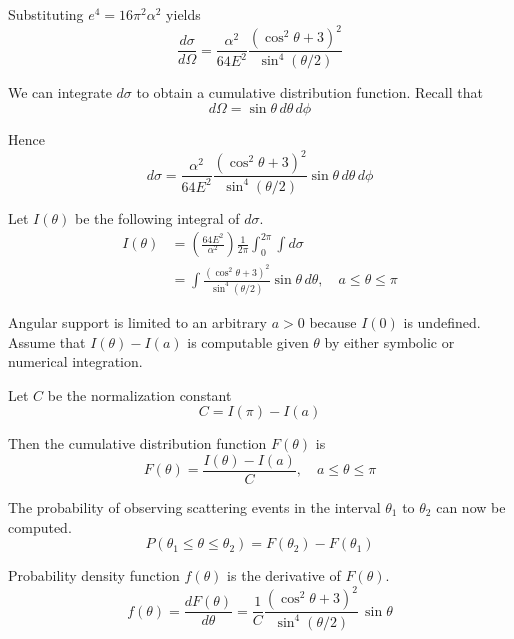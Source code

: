 \documentclass[12pt]{article}
\begin{document}
\noindent
Substituting $e^4=16\pi^2\alpha^2$ yields
\begin{equation*}
\frac{d\sigma}{d\Omega}
=\frac{\alpha^2}{64E^2}
\frac{\left(\cos^2\theta+3\right)^2}{\sin^4(\theta/2)}
\end{equation*}

\noindent
We can integrate $d\sigma$ to obtain a cumulative distribution function.
Recall that
\begin{equation*}
d\Omega=\sin\theta\,d\theta\,d\phi
\end{equation*}

\noindent
Hence
\begin{equation*}
d\sigma=\frac{\alpha^2}{64E^2}
\frac{\left(\cos^2\theta+3\right)^2}{\sin^4(\theta/2)}\sin\theta\,d\theta\,d\phi
\end{equation*}

\bigskip
\noindent
Let $I(\theta)$ be the following integral of $d\sigma$.
\begin{align*}
I(\theta)
&=\left(\frac{64E^2}{\alpha^2}\right)\frac{1}{2\pi}
\int_0^{2\pi}\int d\sigma
\\
&=\int\frac{\left(\cos^2\theta+3\right)^2}{\sin^4(\theta/2)}\sin\theta\,d\theta,
\quad a\le\theta\le\pi
\end{align*}

\noindent
Angular support is limited to an arbitrary $a>0$ because $I(0)$ is undefined.
Assume that $I(\theta)-I(a)$ is computable given $\theta$ by either symbolic or numerical integration.

\bigskip
\noindent
Let $C$ be the normalization constant
\begin{equation*}
C=I(\pi)-I(a)
\end{equation*}

\noindent
Then the cumulative distribution function $F(\theta)$ is
\begin{equation*}
F(\theta)=\frac{I(\theta)-I(a)}{C},
\quad a\le\theta\le\pi
\end{equation*}

\noindent
The probability of observing scattering events in the interval $\theta_1$ to $\theta_2$
can now be computed.
\begin{equation*}
P(\theta_1\le\theta\le\theta_2)=F(\theta_2)-F(\theta_1)
\end{equation*}

\noindent
Probability density function $f(\theta)$ is the derivative of $F(\theta)$.
\begin{equation*}
f(\theta)=\frac{dF(\theta)}{d\theta}
=\frac{1}{C}\frac{\left(\cos^2\theta+3\right)^2}{\sin^4(\theta/2)}\,\sin\theta
\end{equation*}
\end{document}
